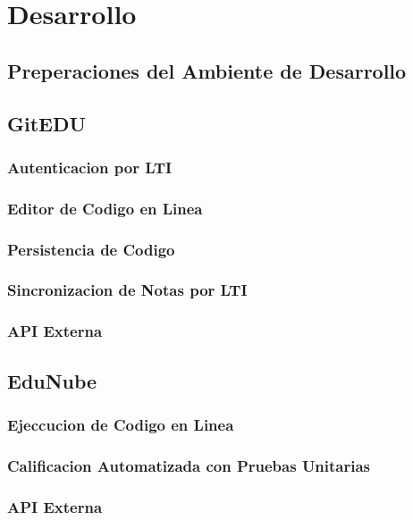
\chapter{Desarrollo}
\label{capitulo4}

\section{Preperaciones del Ambiente de Desarrollo}

\section{GitEDU}

\subsection{Autenticacion por LTI}

\subsection{Editor de Codigo en Linea}

\subsection{Persistencia de Codigo}

\subsection{Sincronizacion de Notas por LTI}

\subsection{API Externa}

\section{EduNube}

\subsection{Ejeccucion de Codigo en Linea}

\subsection{Calificacion Automatizada con Pruebas Unitarias}

\subsection{API Externa}

